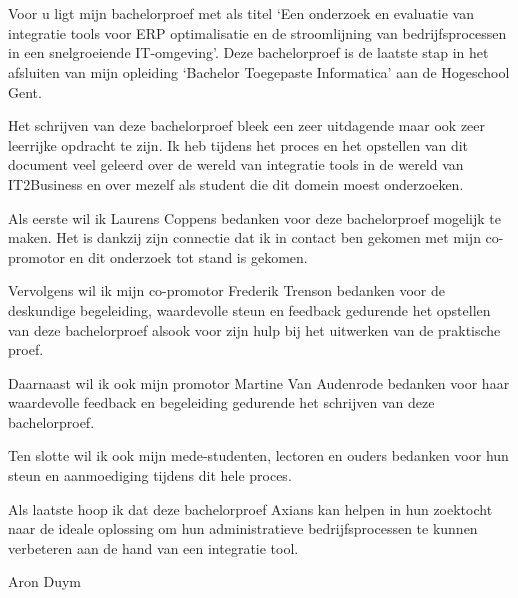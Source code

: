 
\chapter*{}%
\label{ch:voorwoord}


Voor u ligt mijn bachelorproef met als titel ‘Een onderzoek en evaluatie van integratie tools voor ERP optimalisatie en de stroomlijning van bedrijfsprocessen in een snelgroeiende IT-omgeving’. Deze bachelorproef is de laatste stap in het afsluiten van mijn opleiding ‘Bachelor Toegepaste Informatica’ aan de Hogeschool Gent.

\vspace{\baselineskip}

Het schrijven van deze bachelorproef bleek een zeer uitdagende maar ook zeer leerrijke opdracht te zijn. Ik heb tijdens het proces en het opstellen van dit document veel geleerd over de wereld van integratie tools in de wereld van IT2Business en over mezelf als student die dit domein moest onderzoeken.

\vspace{\baselineskip}

Als eerste wil ik Laurens Coppens bedanken voor deze bachelorproef mogelijk te maken. Het is dankzij zijn connectie dat ik in contact ben gekomen met mijn co-promotor en dit onderzoek tot stand is gekomen.

\vspace{\baselineskip}

Vervolgens wil ik mijn co-promotor Frederik Trenson bedanken voor de deskundige begeleiding, waardevolle steun en feedback gedurende het opstellen van deze bachelorproef alsook voor zijn hulp bij het uitwerken van de praktische proef.

\vspace{\baselineskip}

Daarnaast wil ik ook mijn promotor Martine Van Audenrode bedanken voor haar waardevolle feedback en begeleiding gedurende het schrijven van deze bachelorproef.

\vspace{\baselineskip}

Ten slotte wil ik ook mijn mede-studenten, lectoren en ouders bedanken voor hun steun en aanmoediging tijdens dit hele proces.

\vspace{\baselineskip}

Als laatste hoop ik dat deze bachelorproef Axians kan helpen in hun zoektocht naar de ideale oplossing om hun administratieve bedrijfsprocessen te kunnen verbeteren aan de hand van een integratie tool.

\vspace{\baselineskip}

Aron Duym
